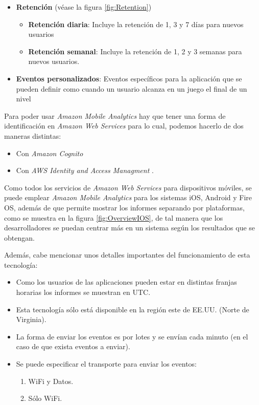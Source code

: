 \documentclass{article}
\begin{document}
\begin{itemize}
\begin{itemize}
	\end{itemize}
	\item \textbf{Retención} (véase la figura \ref{fig:Retention})
	\begin{itemize}
		\item \textbf{Retención diaria}: Incluye la retención de 1, 3  y 7 días para nuevos usuarios
		\item \textbf{Retención semanal}: Incluye la retención de 1, 2 y 3 semanas para nuevos usuarios.
	\end{itemize}
	\item \textbf{Eventos personalizados}: Eventos específicos para la aplicación que se pueden definir como cuando un usuario alcanza en un juego el final de un nivel
\end{itemize}

	Para poder usar \emph{Amazon Mobile Analytics} hay que tener una forma de identificación en \emph{Amazon Web Services} para lo cual, podemos hacerlo de dos maneras distintas:
{\setlength{\parskip}{0mm} 
\begin{itemize}
	\item Con \emph{Amazon Cognito}
	\item Con \emph{AWS Identity and Access Managment} \cite{IAM}.
\end{itemize}
}

	Como todos los servicios de \emph{Amazon Web Services} para dispositivos móviles, se puede emplear \emph{Amazon Mobile Analytics} para los sistemas iOS, Android y Fire OS, además de que permite mostrar los informes separando por plataformas, como se muestra en la figura \ref{fig:OverviewIOS}, de tal manera que los desarrolladores se puedan centrar más en un sistema según los resultados que se obtengan.
	
	Además, cabe mencionar unos detalles importantes del funcionamiento de esta tecnología:
{\setlength{\parskip}{0mm} 
\begin{itemize}
	\item Como los usuarios de las aplicaciones pueden estar en distintas franjas horarias los informes se muestran en UTC.
	\item Esta tecnología sólo está disponible en la región este de EE.UU. (Norte de Virginia).
	\item La forma de enviar los eventos es por lotes y se envían cada minuto (en el caso de que exista eventos a enviar). 
	\item Se puede especificar el transporte para enviar los eventos:
	\begin{enumerate}
		\item WiFi y Datos.
		\item Sólo WiFi.
	\end{enumerate}
\end{itemize}
}
\end{document}
